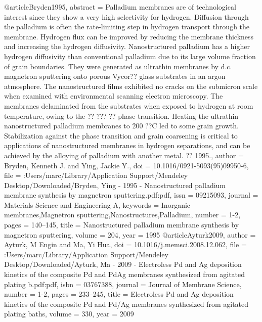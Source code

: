 @article{Bryden1995,
abstract = {Palladium membranes are of technological interest since they show a very high selectivity for hydrogen. Diffusion through the palladium is often the rate-limiting step in hydrogen transport through the membrane. Hydrogen flux can be improved by reducing the membrane thickness and increasing the hydrogen diffusivity. Nanostructured palladium has a higher hydrogen diffusivity than conventional palladium due to its large volume fraction of grain boundaries. They were generated as ultrathin membranes by d.c. magnetron sputtering onto porous Vycor?? glass substrates in an argon atmosphere. The nanostructured films exhibited no cracks on the submicron scale when examined with environmental scanning electron microscopy. The membranes delaminated from the substrates when exposed to hydrogen at room temperature, owing to the ?? ??? ?? phase transition. Heating the ultrathin nanostructured palladium membranes to 200 ??C led to some grain growth. Stabilization against the phase transition and grain coarsening is critical to applications of nanostructured membranes in hydrogen separations, and can be achieved by the alloying of palladium with another metal. ?? 1995.},
author = {Bryden, Kenneth J. and Ying, Jackie Y.},
doi = {10.1016/0921-5093(95)09950-6},
file = {:Users/marc/Library/Application Support/Mendeley Desktop/Downloaded/Bryden, Ying - 1995 - Nanostructured palladium membrane synthesis by magnetron sputtering.pdf:pdf},
issn = {09215093},
journal = {Materials Science and Engineering A},
keywords = {Inorganic membranes,Magnetron sputtering,Nanostructures,Palladium},
number = {1-2},
pages = {140--145},
title = {{Nanostructured palladium membrane synthesis by magnetron sputtering}},
volume = {204},
year = {1995}
}
@article{Ayturk2009,
author = {Ayturk, M Engin and Ma, Yi Hua},
doi = {10.1016/j.memsci.2008.12.062},
file = {:Users/marc/Library/Application Support/Mendeley Desktop/Downloaded/Ayturk, Ma - 2009 - Electroless Pd and Ag deposition kinetics of the composite Pd and PdAg membranes synthesized from agitated plating b.pdf:pdf},
isbn = {03767388},
journal = {Journal of Membrane Science},
number = {1-2},
pages = {233--245},
title = {{Electroless Pd and Ag deposition kinetics of the composite Pd and Pd/Ag membranes synthesized from agitated plating baths}},
volume = {330},
year = {2009}
}
